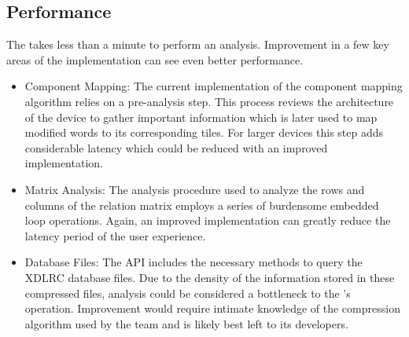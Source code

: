 \subsection{Performance}
The \NameNoPeriod takes less than a minute to perform an analysis.
Improvement in a few key areas of the implementation can see even better performance.
\begin{itemize}
	\item Component Mapping: The current implementation of the component mapping algorithm relies on a pre-analysis step. 
	This process reviews the architecture of the device to gather important information which is later used to map modified words to its corresponding tiles. 
	For larger devices this step adds considerable latency which could be reduced with an improved implementation. 
	\item Matrix Analysis: The analysis procedure used to analyze the rows and columns of the relation matrix employs a series of burdensome embedded loop operations. 
	Again, an improved implementation can greatly reduce the latency period of the user experience.
	\item \RapidSmith Database Files: The \RapidSmith \acrshort{API} includes the necessary methods to query the XDLRC database files.
	Due to the density of the information stored in these compressed files, analysis could be considered a bottleneck to the \Name's operation. 
	Improvement would require intimate knowledge of the compression algorithm used by the \RapidSmith team and is likely best left to its developers. 
\end{itemize}
